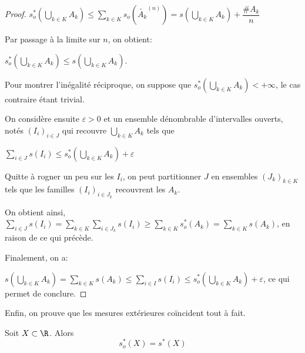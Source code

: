 \begin{proof}
$
s_o^{*}\left(\bigcup \limits_{k \in K} A_k\right) \leq \displaystyle{\sum \limits_{k \in K}} s_o\left(\widetilde{A_k}^{(n)}\right) = s\left(\bigcup \limits_{k \in K} A_k\right) + \dfrac{\#{A_k}}{n}
$

Par passage à la limite sur $n$, on obtient:

$s_o^{*}\left(\bigcup \limits_{k \in K} A_k\right) \leq s\left(\bigcup \limits_{k \in K} A_k\right)$.

Pour montrer l'inégalité réciproque, on suppose que $s_o^{*}\left(\bigcup \limits_{k \in K} A_k\right)< +\infty$, le cas contraire étant trivial.

On considère ensuite $\varepsilon > 0$ et un ensemble dénombrable d'intervalles ouverts, notés $\left(I_i\right)_{i \in J}$ qui recouvre $\bigcup \limits_{k \in K} A_k$ tels que

$
\displaystyle{\sum \limits_{i \in J}} s(I_i) \leq s_o^{*}\left(\bigcup \limits_{k \in K} A_k\right) + \varepsilon
$

Quitte à \og rogner \fg{} un peu sur les $I_i$, on peut partitionner $J$ en ensembles $\left(J_k\right)_{k \in K}$ tels que les familles $\left(I_i\right)_{i \in J_k}$ recouvrent les $A_k$.

On obtient ainsi, $\displaystyle{\sum \limits_{i \in J}} s(I_i)  = \displaystyle{\sum \limits_{k \in K}} \displaystyle{\sum \limits_{i \in J_k}} s(I_i) \geq \displaystyle{\sum \limits_{k \in K}} s_o^{*}(A_k) = \displaystyle{\sum \limits_{k \in K}} s(A_k)$, en raison de ce qui précède.

Finalement, on a:

$s\left(\bigcup \limits_{k \in K} A_k\right) = \displaystyle{\sum \limits_{k \in K}} s(A_k) \leq \displaystyle{\sum \limits_{i \in I}} s(I_i) \leq s_o^{*}\left(\bigcup \limits_{k \in K} A_k\right) + \varepsilon$, ce qui permet de conclure.
\end{proof}


Enfin, on prouve que les mesures extérieures coïncident tout à fait.

\begin{prop}
Soit $X \subset \R$. Alors
\[
s_o^{*}(X)=s^{*}(X)
\]
\end{prop}

